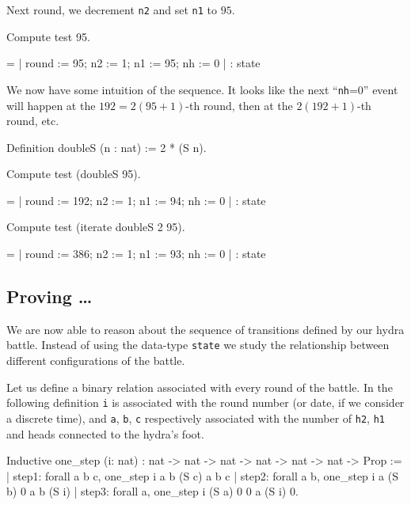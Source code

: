 Next round, we decrement \texttt{n2} and set \texttt{n1} to $95$.


\begin{Coqsrc}
 Compute test 95.
\end{Coqsrc}

\begin{Coqanswer}
  = {| round := 95; n2 := 1; n1 := 95; nh := 0 |}
     : state
\end{Coqanswer}

We now have some intuition of the sequence.
It looks like the next ``\texttt{nh}=0'' event will happen at the $192=2(95+1)$-th round, then at the $2(192+1)$-th round, etc.


\begin{Coqsrc}
Definition doubleS (n : nat) := 2 * (S n).

Compute test (doubleS 95).
\end{Coqsrc}

\begin{Coqanswer}
 = {| round := 192; n2 := 1; n1 := 94; nh := 0 |}
     : state
\end{Coqanswer}

\begin{Coqsrc}
Compute test (iterate doubleS 2 95).
\end{Coqsrc}

\begin{Coqanswer}
  = {| round := 386; n2 := 1; n1 := 93; nh := 0 |}
     : state
\end{Coqanswer}

\subsection{Proving \dots}
We are now able to reason about the sequence of transitions defined by our hydra battle. Instead of using the data-type \texttt{state} we study the relationship
between different configurations of the battle.

Let us define a binary relation associated with every round of the battle.
In the following definition \texttt{i} is associated with the round number (or date, if we consider a discrete time), and \texttt{a}, \texttt{b}, \texttt{c} respectively associated with the number of \texttt{h2}, \texttt{h1} and heads connected to the hydra's foot.

\begin{Coqsrc}
Inductive one_step (i: nat) :
  nat -> nat -> nat -> nat -> nat -> nat -> Prop :=
| step1: forall a b c, one_step i a b (S c) a b c
| step2:  forall a b, one_step i a (S b) 0 a b (S i)
| step3: forall a, one_step i (S a) 0 0 a (S i) 0.
\end{Coqsrc}

